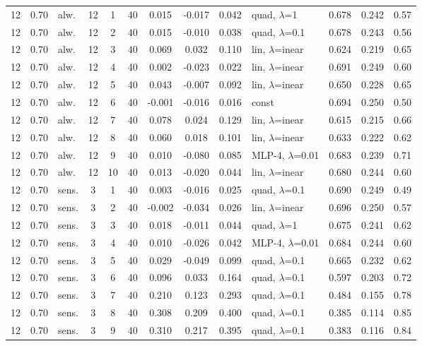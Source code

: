 \begin{scriptsize}
\begin{longtable}{cclcc c ccc l ccc}
12 & 0.70 & alw. & 12 & 1 & 40 & 0.015 & -0.017 & 0.042 & quad, $\lambda$=1 & 0.678 & 0.242 & 0.57 \\
12 & 0.70 & alw. & 12 & 2 & 40 & 0.015 & -0.010 & 0.038 & quad, $\lambda$=0.1 & 0.678 & 0.243 & 0.56 \\
12 & 0.70 & alw. & 12 & 3 & 40 & 0.069 & 0.032 & 0.110 & lin, $\lambda$=inear & 0.624 & 0.219 & 0.65 \\
12 & 0.70 & alw. & 12 & 4 & 40 & 0.002 & -0.023 & 0.022 & lin, $\lambda$=inear & 0.691 & 0.249 & 0.60 \\
12 & 0.70 & alw. & 12 & 5 & 40 & 0.043 & -0.007 & 0.092 & lin, $\lambda$=inear & 0.650 & 0.228 & 0.65 \\
12 & 0.70 & alw. & 12 & 6 & 40 & -0.001 & -0.016 & 0.016 & const & 0.694 & 0.250 & 0.50 \\
12 & 0.70 & alw. & 12 & 7 & 40 & 0.078 & 0.024 & 0.129 & lin, $\lambda$=inear & 0.615 & 0.215 & 0.66 \\
12 & 0.70 & alw. & 12 & 8 & 40 & 0.060 & 0.018 & 0.101 & lin, $\lambda$=inear & 0.633 & 0.222 & 0.62 \\
12 & 0.70 & alw. & 12 & 9 & 40 & 0.010 & -0.080 & 0.085 & MLP-4, $\lambda$=0.01 & 0.683 & 0.239 & 0.71 \\
12 & 0.70 & alw. & 12 & 10 & 40 & 0.013 & -0.020 & 0.044 & lin, $\lambda$=inear & 0.680 & 0.244 & 0.60 \\
12 & 0.70 & sens. & 3 & 1 & 40 & 0.003 & -0.016 & 0.025 & quad, $\lambda$=0.1 & 0.690 & 0.249 & 0.49 \\
12 & 0.70 & sens. & 3 & 2 & 40 & -0.002 & -0.034 & 0.026 & lin, $\lambda$=inear & 0.696 & 0.250 & 0.57 \\
12 & 0.70 & sens. & 3 & 3 & 40 & 0.018 & -0.011 & 0.044 & quad, $\lambda$=1 & 0.675 & 0.241 & 0.62 \\
12 & 0.70 & sens. & 3 & 4 & 40 & 0.010 & -0.026 & 0.042 & MLP-4, $\lambda$=0.01 & 0.684 & 0.244 & 0.60 \\
12 & 0.70 & sens. & 3 & 5 & 40 & 0.029 & -0.049 & 0.099 & quad, $\lambda$=0.1 & 0.665 & 0.232 & 0.62 \\
12 & 0.70 & sens. & 3 & 6 & 40 & 0.096 & 0.033 & 0.164 & quad, $\lambda$=0.1 & 0.597 & 0.203 & 0.72 \\
12 & 0.70 & sens. & 3 & 7 & 40 & 0.210 & 0.123 & 0.293 & quad, $\lambda$=0.1 & 0.484 & 0.155 & 0.78 \\
12 & 0.70 & sens. & 3 & 8 & 40 & 0.308 & 0.209 & 0.400 & quad, $\lambda$=0.1 & 0.385 & 0.114 & 0.85 \\
12 & 0.70 & sens. & 3 & 9 & 40 & 0.310 & 0.217 & 0.395 & quad, $\lambda$=0.1 & 0.383 & 0.116 & 0.84 \\

\end{longtable}
\end{scriptsize}
